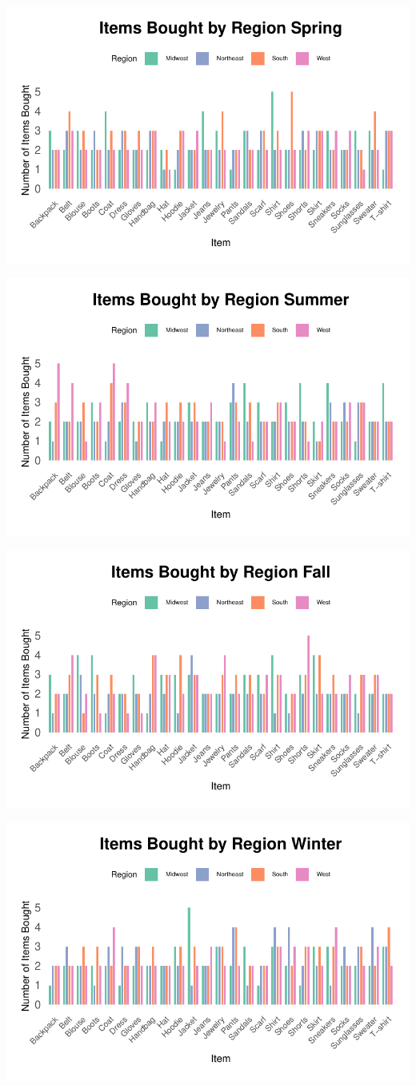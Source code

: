 \documentclass[
  letterpaper,
  DIV=11,
  numbers=noendperiod]{scrartcl}
\begin{document}
\includegraphics{Quarto-Stat-184-Final-Project_files/figure-pdf/create_each_plot-1.pdf}

\includegraphics{Quarto-Stat-184-Final-Project_files/figure-pdf/create_each_plot-2.pdf}

\includegraphics{Quarto-Stat-184-Final-Project_files/figure-pdf/create_each_plot-3.pdf}

\includegraphics{Quarto-Stat-184-Final-Project_files/figure-pdf/create_each_plot-4.pdf}
\end{document}
